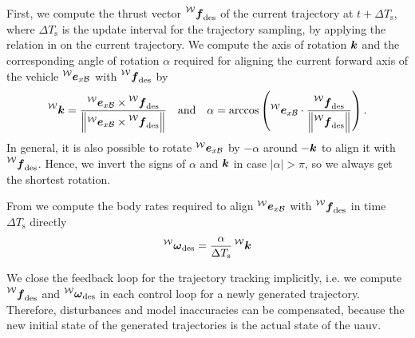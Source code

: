 First, we compute the thrust vector $\thrustdesiredworld$ of the current trajectory at $t+\Delta T_\text{s}$, where $\Delta T_{\text{s}}$ is the update interval for the trajectory sampling, by applying the relation in  on the current trajectory.
We compute the axis of rotation $\mbox{$\bm{k}$}$ and the corresponding angle of rotation $\alpha$ required for aligning the current forward axis of the vehicle $\prescript{\mathcal{W}}{}{\mbox{$\bm{e}$}}_{x\mathcal{B}}$ with $\thrustdesiredworld$ by
\begin{equation}
	\label{eq:rotation-to-desired-thrust-vector}
	\rotationaxisworld = \frac{
		\exbodyinworld \times \thrustdesiredworld
	}{
		\left\lVert
			\exbodyinworld \times \thrustdesiredworld
		\right\rVert}
	\quad
	\text{and}
	\quad
	\alpha = \arccos\left(
		\exbodyinworld \cdot
		\frac{\thrustdesiredworld}{\left\lVert\thrustdesiredworld\right\rVert}
	\right)
	.
\end{equation}
In general, it is also possible to rotate $\prescript{\mathcal{W}}{}{\mbox{$\bm{e}$}}_{x\mathcal{B}}$ by $-\alpha$ around $-\mbox{$\bm{k}$}$ to align it with $\thrustdesiredworld$. Hence, we invert the signs of $\alpha$ and $\mbox{$\bm{k}$}$ in case $\lvert\alpha\rvert > \pi$, so we always get the shortest rotation. 

From  we compute the body rates required to align $\prescript{\mathcal{W}}{}{\mbox{$\bm{e}$}}_{x\mathcal{B}}$ with $\thrustdesiredworld$ in time $\Delta T_{\text{s}}$ directly
\begin{equation}
	\vangdesiredworld = \frac{\alpha}{\Delta T_{\text{s}}} \rotationaxisworld
\end{equation}

We close the feedback loop for the trajectory tracking implicitly, i.e. we compute $\thrustdesiredworld$ and $\vangdesiredworld$ in each control loop for a newly generated trajectory.
Therefore, disturbances and model inaccuracies can be compensated, because the new initial state of the generated trajectories is the actual state of the \ac{uauv}.

